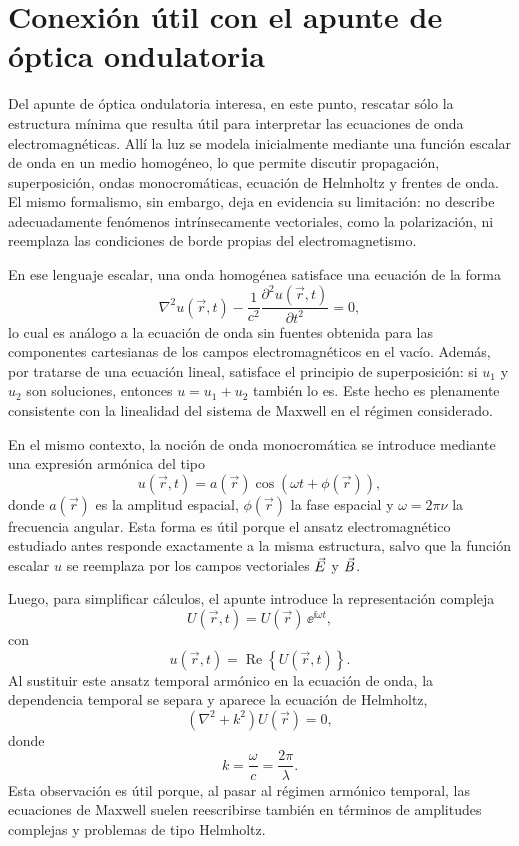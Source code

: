\documentclass[../main.tex]{subfiles}
\begin{document}
\chapter{Conexión útil con el apunte de óptica ondulatoria}
\label{ap:optica-ondulatoria}

Del apunte de óptica ondulatoria interesa, en este punto, rescatar sólo la estructura mínima que resulta útil para interpretar las ecuaciones de onda electromagnéticas. Allí la luz se modela inicialmente mediante una función escalar de onda en un medio homogéneo, lo que permite discutir propagación, superposición, ondas monocromáticas, ecuación de Helmholtz y frentes de onda. El mismo formalismo, sin embargo, deja en evidencia su limitación: no describe adecuadamente fenómenos intrínsecamente vectoriales, como la polarización, ni reemplaza las condiciones de borde propias del electromagnetismo.

En ese lenguaje escalar, una onda homogénea satisface una ecuación de la forma
\begin{equation*}
    \nabla^2 u(\vec r,t)-\frac{1}{c^2}\frac{\partial^2 u(\vec r,t)}{\partial t^2}=0,
\end{equation*}
lo cual es análogo a la ecuación de onda sin fuentes obtenida para las componentes cartesianas de los campos electromagnéticos en el vacío. Además, por tratarse de una ecuación lineal, satisface el principio de superposición: si $u_1$ y $u_2$ son soluciones, entonces $u=u_1+u_2$ también lo es. Este hecho es plenamente consistente con la linealidad del sistema de Maxwell en el régimen considerado.

En el mismo contexto, la noción de onda monocromática se introduce mediante una expresión armónica del tipo
\begin{equation*}
    u(\vec r,t)=a(\vec r)\cos\left(\omega t+\phi(\vec r)\right),
\end{equation*}
donde $a(\vec r)$ es la amplitud espacial, $\phi(\vec r)$ la fase espacial y $\omega=2\pi\nu$ la frecuencia angular. Esta forma es útil porque el ansatz electromagnético estudiado antes responde exactamente a la misma estructura, salvo que la función escalar $u$ se reemplaza por los campos vectoriales $\vec{E}$ y $\vec{B}$.

Luego, para simplificar cálculos, el apunte introduce la representación compleja
\begin{equation*}
    U(\vec r,t)=U(\vec r)\,\ee^{\ii\omega t},
\end{equation*}
con
\begin{equation*}
    u(\vec r,t)=\operatorname{Re}\left\{U(\vec r,t)\right\}.
\end{equation*}
Al sustituir este ansatz temporal armónico en la ecuación de onda, la dependencia temporal se separa y aparece la ecuación de Helmholtz,
\begin{equation*}
    (\nabla^2+k^2)U(\vec r)=0,
\end{equation*}
donde
\begin{equation*}
    k=\frac{\omega}{c}=\frac{2\pi}{\lambda}.
\end{equation*}
Esta observación es útil porque, al pasar al régimen armónico temporal, las ecuaciones de Maxwell suelen reescribirse también en términos de amplitudes complejas y problemas de tipo Helmholtz.
\end{document}
